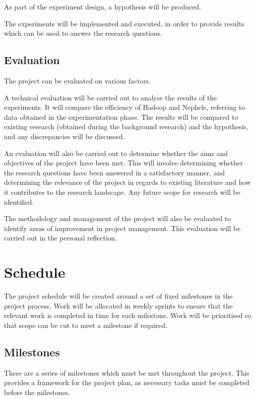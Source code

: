 As part of the experiment design, a hypothesis will be produced.

The experiments will be implemented and executed, in order to provide results which can be used to answer the research questions.

\subsection{Evaluation}
The project can be evaluated on various factors.

A technical evaluation will be carried out to analyse the results of the experiments. It will compare the efficiency of Hadoop and Nephele, referring to data obtained in the experimentation phase. The results will be compared to existing research (obtained during the background research) and the hypothesis, and any discrepancies will be discussed. 

An evaluation will also be carried out to determine whether the aims and objectives of the project have been met. This will involve determining whether the research questions have been answered in a satisfactory manner, and determining the relevance of the project in regards to existing literature and how it contributes to the research landscape. Any future scope for research will be identified. 

The methodology and management of the project will also be evaluated to identify areas of improvement in project management. This evaluation will be carried out in the personal reflection.

\section{Schedule}
The project schedule will be created around a set of fixed milestones in the project process. Work will be allocated in weekly sprints to ensure that the relevant work is completed in time for each milestone. Work will be prioritised so that scope can be cut to meet a milestone if required.

\subsection{Milestones}
There are a series of milestones which must be met throughout the project. This provides a framework for the project plan, as necessary tasks must be completed before the milestones.

